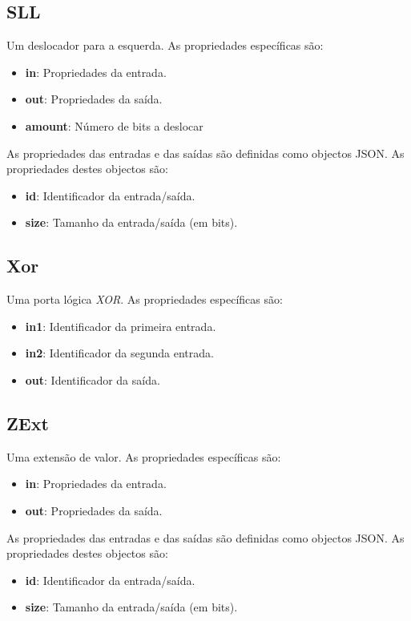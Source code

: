 \documentclass[11pt,a4paper,twoside,titlepage]{report}
\begin{document}
\subsection{SLL}

Um deslocador para a esquerda. As propriedades específicas são:
\begin{itemize}
	\item \textbf{in}: Propriedades da entrada.
	\item \textbf{out}: Propriedades da saída.
	\item \textbf{amount}: Número de bits a deslocar
\end{itemize}

As propriedades das entradas e das saídas são definidas como objectos JSON.
As propriedades destes objectos são:
\begin{itemize}
	\item \textbf{id}: Identificador da entrada/saída.
	\item \textbf{size}: Tamanho da entrada/saída (em bits).
\end{itemize}

\subsection{Xor}

Uma porta lógica \emph{XOR}. As propriedades específicas são:
\begin{itemize}
	\item \textbf{in1}: Identificador da primeira entrada.
	\item \textbf{in2}: Identificador da segunda entrada.
	\item \textbf{out}: Identificador da saída.
\end{itemize}

\subsection{ZExt}
Uma extensão de valor. As propriedades específicas são:
\begin{itemize}
	\item \textbf{in}: Propriedades da entrada.
	\item \textbf{out}: Propriedades da saída.
\end{itemize}

As propriedades das entradas e das saídas são definidas como objectos JSON.
As propriedades destes objectos são:
\begin{itemize}
	\item \textbf{id}: Identificador da entrada/saída.
	\item \textbf{size}: Tamanho da entrada/saída (em bits).
\end{itemize}
\end{document}
